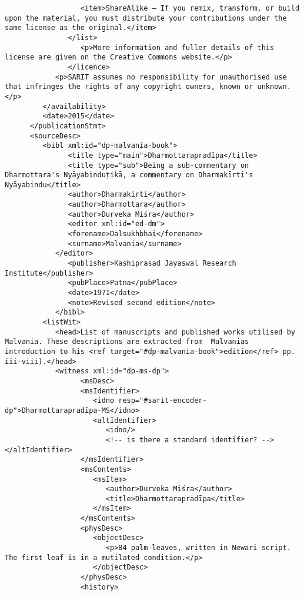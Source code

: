 \documentclass[article,12pt,a4paper]{memoir}
\begin{document}
\begin{verbatim}
                  <item>ShareAlike — If you remix, transform, or build upon the material, you must distribute your contributions under the same license as the original.</item>
               </list>
	              <p>More information and fuller details of this license are given on the Creative Commons website.</p>
	           </licence>
            <p>SARIT assumes no responsibility for unauthorised use that infringes the rights of any copyright owners, known or unknown.</p>
         </availability>
         <date>2015</date>
      </publicationStmt>
      <sourceDesc>
         <bibl xml:id="dp-malvania-book">
	           <title type="main">Dharmottarapradīpa</title>
	           <title type="sub">Being a sub-commentary on Dharmottara's Nyāyabinduṭikā, a commentary on Dharmakīrti's Nyāyabindu</title>
	           <author>Dharmakīrti</author>
	           <author>Dharmottara</author>
	           <author>Durveka Miśra</author>
	           <editor xml:id="ed-dm">
               <forename>Dalsukhbhai</forename> 
               <surname>Malvania</surname>
            </editor>
	           <publisher>Kashiprasad Jayaswal Research Institute</publisher>
	           <pubPlace>Patna</pubPlace>
	           <date>1971</date>
	           <note>Revised second edition</note>
	        </bibl>
         <listWit>
            <head>List of manuscripts and published works utilised by Malvania. These descriptions are extracted from  Malvanias  introduction to his <ref target="#dp-malvania-book">edition</ref> pp. iii-viii).</head>
            <witness xml:id="dp-ms-dp">
	              <msDesc>
                  <msIdentifier>
                     <idno resp="#sarit-encoder-dp">Dharmottarapradīpa-MS</idno>
                     <altIdentifier>
                        <idno/>
                        <!-- is there a standard identifier? --></altIdentifier>
                  </msIdentifier>
                  <msContents>
                     <msItem>
                        <author>Durveka Miśra</author>
                        <title>Dharmottarapradīpa</title>
                     </msItem>
                  </msContents>
                  <physDesc>
                     <objectDesc>
                        <p>84 palm-leaves, written in Newari script. The first leaf is in a mutilated condition.</p>
                     </objectDesc>
                  </physDesc>
                  <history>

\end{verbatim}
\end{document}
